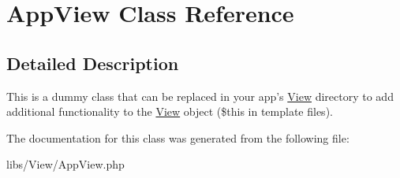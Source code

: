 \hypertarget{classAppView}{
\section{AppView Class Reference}
\label{classAppView}
}


\subsection{Detailed Description}
This is a dummy class that can be replaced in your app's \hyperlink{classView}{View} directory to add additional functionality to the \hyperlink{classView}{View} object (\$this in template files). 

The documentation for this class was generated from the following file:\begin{DoxyCompactItemize}
\item 
libs/View/AppView.php\end{DoxyCompactItemize}
